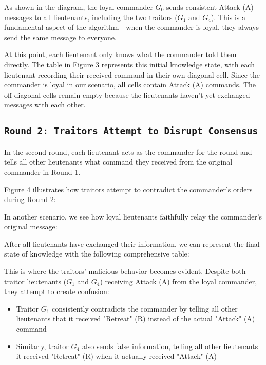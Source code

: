 \documentclass[11pt]{article}
\newcommand{\gen}[1]{\ensuremath{G_{#1}}}
\begin{document}


\justifying
As shown in the diagram, the loyal commander $\gen{0}$ sends consistent Attack (A) messages to all lieutenants, including the two traitors ($\gen{1}$ and $\gen{4}$). This is a fundamental aspect of the algorithm - when the commander is loyal, they always send the same message to everyone.

At this point, each lieutenant only knows what the commander told them directly. The table in Figure 3 represents this initial knowledge state, with each lieutenant recording their received command in their own diagonal cell. Since the commander is loyal in our scenario, all cells contain Attack (A) commands. The off-diagonal cells remain empty because the lieutenants haven't yet exchanged messages with each other.

\subsection*{\texttt{\large Round 2: Traitors Attempt to Disrupt Consensus}}
\justifying
In the second round, each lieutenant acts as the commander for the round and tells all other lieutenants what command they received from the original commander in Round 1.

Figure 4 illustrates how traitors attempt to contradict the commander's orders during Round 2:



\justifying
In another scenario, we see how loyal lieutenants faithfully relay the commander's original message:



\justifying
After all lieutenants have exchanged their information, we can represent the final state of knowledge with the following comprehensive table:



\justifying
This is where the traitors' malicious behavior becomes evident. Despite both traitor lieutenants ($\gen{1}$ and $\gen{4}$) receiving Attack (A) from the loyal commander, they attempt to create confusion:

\begin{itemize}
    \item Traitor $\gen{1}$ consistently contradicts the commander by telling all other lieutenants that it received "Retreat" (R) instead of the actual "Attack" (A) command

    \item Similarly, traitor $\gen{4}$ also sends false information, telling all other lieutenants it received "Retreat" (R) when it actually received "Attack" (A)
\end{itemize}
\end{document}
